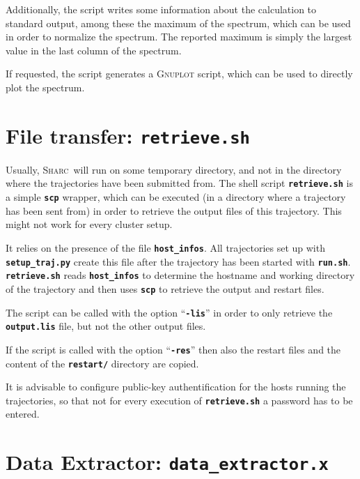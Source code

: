 \documentclass[a4paper,11pt,DIV=15,openany,twoside=false]{scrbook}
\newcommand{\sharc}{\textsc{Sharc}}
\newcommand{\ttt}[1]{\textbf{\texttt{#1}}}
\begin{document}
Additionally, the script writes some information about the calculation to standard output, among these the maximum of the spectrum, which can be used in order to normalize the spectrum. The reported maximum is simply the largest value in the last column of the spectrum. 

If requested, the script generates a \textsc{Gnuplot} script, which can be used to directly plot the spectrum. 






\section{File transfer: \ttt{retrieve.sh}}\label{sec:retrieve}

Usually, \sharc\ will run on some temporary directory, and not in the directory where the trajectories have been submitted from. The shell script \ttt{retrieve.sh} is a simple \ttt{scp} wrapper, which can be executed (in a directory where a trajectory has been sent from) in order to retrieve the output files of this trajectory. This might not work for every cluster setup.

It relies on the presence of the file \ttt{host\_infos}. All trajectories set up with \ttt{setup\_traj.py} create this file after the trajectory has been started with \ttt{run.sh}. \ttt{retrieve.sh} reads \ttt{host\_infos} to determine the hostname and working directory of the trajectory and then uses \ttt{scp} to retrieve the output and restart files.

The script can be called with the option ``\ttt{-lis}'' in order to only retrieve the \ttt{output.lis} file, but not the other output files.

If the script is called with the option ``\ttt{-res}'' then also the restart files and the content of the \ttt{restart/} directory are copied.

It is advisable to configure public-key authentification for the hosts running the trajectories, so that not for every execution of \ttt{retrieve.sh} a password has to be entered.











\section{Data Extractor: \ttt{data\_extractor.x}}\label{sec:data_extractor.x}
\end{document}
